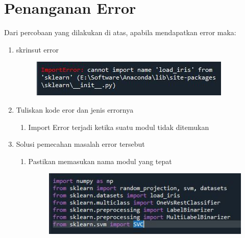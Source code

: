 \section{Penanganan Error}
Dari percobaan yang dilakukan di atas, apabila mendapatkan error maka:

\begin{enumerate}
	\item
	skrinsut error\
    \begin{figure}[!htbp]
        \centering
        \includegraphics[scale=0.5]{figures/6.JPG}
        \end{figure}

	\item
Tuliskan kode eror dan jenis errornya\
    \begin{enumerate}
        \item Import Error terjadi ketika suatu modul tidak ditemukan
    \end{enumerate}

	\item
Solusi pemecahan masalah error tersebut\
\begin{enumerate}
    \item Pastikan memasukan nama modul yang tepat \
    \begin{figure}[!htbp]
        \centering
        \includegraphics[scale=0.7]{figures/7.JPG}
        \end{figure}
    
\end{enumerate}

\end{enumerate}

